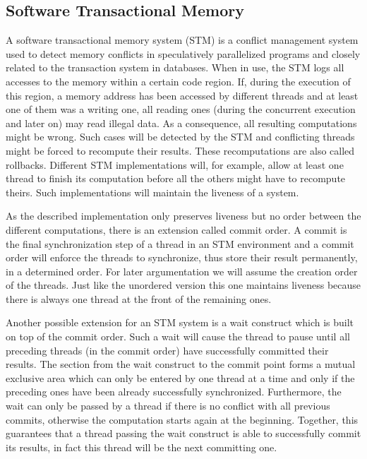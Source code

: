 \subsection{Software Transactional Memory}
A software transactional memory system (STM) is a conflict management system used to detect
memory conflicts in speculatively parallelized programs and closely related to
the transaction system in databases. When in use, the STM logs
all accesses to the memory within a certain code region.
If, during the execution of this region, a memory address has been accessed
by different threads and at least one of them was a writing one, all reading
ones (during the concurrent execution and later on) may read illegal data.
As a consequence, all resulting computations might be wrong. Such cases will be
detected by the STM and  conflicting threads might be forced to recompute 
their results. These recomputations are also called  rollbacks.
Different STM implementations will, for example,
allow at least one thread to finish its computation before all the others might
have to recompute theirs. Such implementations will maintain the liveness of
a system. 

As the described implementation only preserves liveness but no order between
the different computations, there is an extension called commit order. 
A commit is the final synchronization step of a thread in an STM environment and
a commit order will enforce the threads to synchronize, thus store their result
permanently, in a determined order. For later argumentation we will assume the 
creation order of the threads. 
Just like the unordered version this one maintains liveness because there is always
one thread at the front of the remaining ones. 

Another possible extension for an STM system is a wait construct which is built
on top of the commit order. Such a wait will cause the thread to pause until 
all preceding threads (in the commit order) have successfully committed their results.
The section from the wait construct to the commit point forms a mutual exclusive
area which can only be entered by one thread at a time and only if the preceding
ones have been already successfully synchronized. Furthermore, the wait can only
be passed by a thread if there is no conflict with all previous commits, otherwise
the computation starts again at the beginning. Together, this guarantees that a 
thread passing the wait construct is able to successfully commit its results, in 
fact this thread will be the next committing one.

